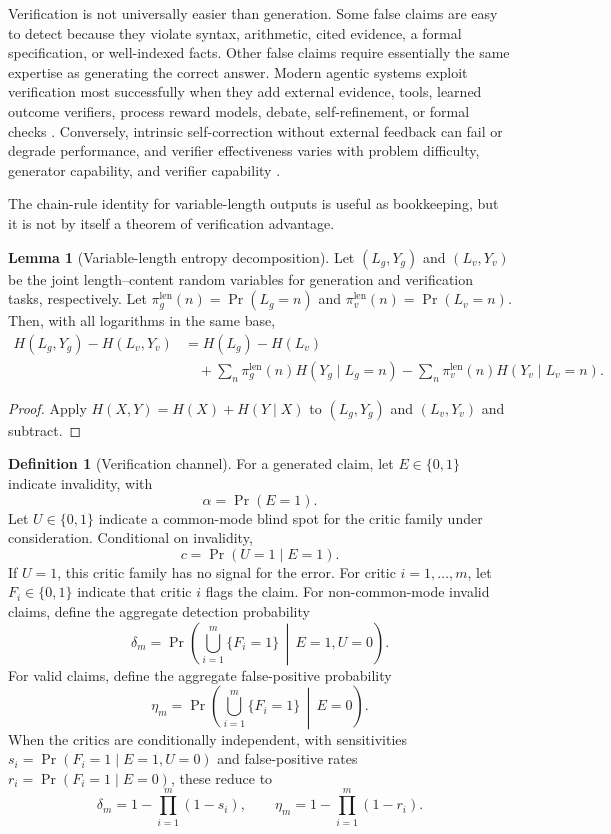 \documentclass[12pt]{article}
\theoremstyle{definition}
\newtheorem{definition}{Definition}[section]
\newtheorem{lemma}{Lemma}[section]
\begin{document}
Verification is not universally easier than generation.  Some false claims are
easy to detect because they violate syntax, arithmetic, cited evidence, a formal
specification, or well-indexed facts.  Other false claims require essentially
the same expertise as generating the correct answer.  Modern agentic systems
exploit verification most successfully when they add external evidence, tools,
learned outcome verifiers, process reward models, debate, self-refinement, or
formal checks
\parencite{cobbe2021trainingverifiers,uesato2022processoutcome,lightman2023verify,irving2018debate,du2023multiagentdebate,yao2022react,schick2023toolformer}.  Conversely,
intrinsic self-correction without external feedback can fail or degrade
performance, and verifier effectiveness varies with problem difficulty,
generator capability, and verifier capability
\parencite{huang2023cannotselfcorrect,zhou2025verificationdynamics}.

The chain-rule identity for variable-length outputs is useful as bookkeeping,
but it is not by itself a theorem of verification advantage.

\begin{lemma}[Variable-length entropy decomposition]
\label{lem:variable_length_decomposition}
Let $(L_g,Y_g)$ and $(L_v,Y_v)$ be the joint length--content random variables
for generation and verification tasks, respectively.  Let
$\pi^{\mathrm{len}}_g(n)=\Pr(L_g=n)$ and
$\pi^{\mathrm{len}}_v(n)=\Pr(L_v=n)$.  Then, with all logarithms in the same
base,
\begin{align*}
H(L_g,Y_g)-H(L_v,Y_v)
&=H(L_g)-H(L_v) \\
&\quad +\sum_n \pi^{\mathrm{len}}_g(n)H(Y_g\mid L_g=n)
       -\sum_n \pi^{\mathrm{len}}_v(n)H(Y_v\mid L_v=n).
\end{align*}
\end{lemma}

\begin{proof}
Apply $H(X,Y)=H(X)+H(Y\mid X)$ to $(L_g,Y_g)$ and $(L_v,Y_v)$ and subtract.
\end{proof}

\begin{definition}[Verification channel]
\label{def:verification-channel}
For a generated claim, let $E\in\{0,1\}$ indicate invalidity, with
\[
 \alpha=\Pr(E=1).
\]
Let $U\in\{0,1\}$ indicate a common-mode blind spot for the critic family under
consideration.  Conditional on invalidity,
\[
  c=\Pr(U=1\mid E=1).
\]
If $U=1$, this critic family has no signal for the error.  For critic
$i=1,\dots,m$, let $F_i\in\{0,1\}$ indicate that critic $i$ flags the claim.
For non-common-mode invalid claims, define the aggregate detection probability
\[
  \delta_m=\Pr\left(\bigcup_{i=1}^m\{F_i=1\}\,\middle|\,E=1,U=0\right).
\]
For valid claims, define the aggregate false-positive probability
\[
  \eta_m=\Pr\left(\bigcup_{i=1}^m\{F_i=1\}\,\middle|\,E=0\right).
\]
When the critics are conditionally independent, with sensitivities
$s_i=\Pr(F_i=1\mid E=1,U=0)$ and false-positive rates
$r_i=\Pr(F_i=1\mid E=0)$, these reduce to
\[
  \delta_m=1-\prod_{i=1}^m(1-s_i),
  \qquad
  \eta_m=1-\prod_{i=1}^m(1-r_i).
\]
\end{definition}
\end{document}
